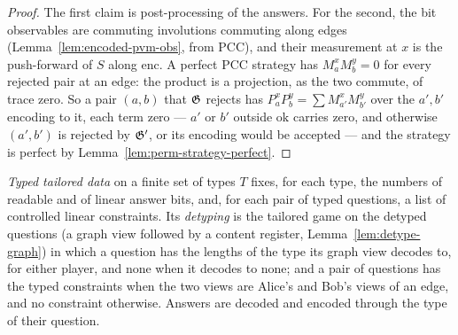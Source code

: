 \begin{proof}
\leanok
The first claim is post-processing of the answers. For the second, the bit observables are
commuting involutions commuting along edges (Lemma~\ref{lem:encoded-pvm-obs}, from PCC), and
their measurement at $x$ is the push-forward of $S$ along $\mathrm{enc}$. A perfect PCC
strategy has $M^x_a M^y_b = 0$ for every rejected pair at an edge: the product is a
projection, as the two commute, of trace zero. So a pair $(a, b)$ that $\mathfrak{G}$ rejects
has $P^x_a P^y_b = \sum M^x_{a'} M^y_{b'}$ over the $a', b'$ encoding to it, each term zero —
$a'$ or $b'$ outside $\mathrm{ok}$ carries zero, and otherwise $(a', b')$ is rejected by
$\mathfrak{G}'$, or its encoding would be accepted — and the strategy is perfect by
Lemma~\ref{lem:perm-strategy-perfect}.
\end{proof}

\begin{definition}
\label{def:tailored-detyping}
\leanok
\emph{Typed tailored data} on a finite set of types $T$ fixes, for each type, the numbers of
readable and of linear answer bits, and, for each pair of typed questions, a list of controlled
linear constraints. Its \emph{detyping} is the tailored game on the detyped questions (a graph
view followed by a content register, Lemma~\ref{lem:detype-graph}) in which a question has the
lengths of the type its graph view decodes to, for either player, and none when it decodes to
none; and a pair of questions has the typed constraints when the two views are Alice's and
Bob's views of an edge, and no constraint otherwise. Answers are decoded and encoded through the
type of their question.
\end{definition}

